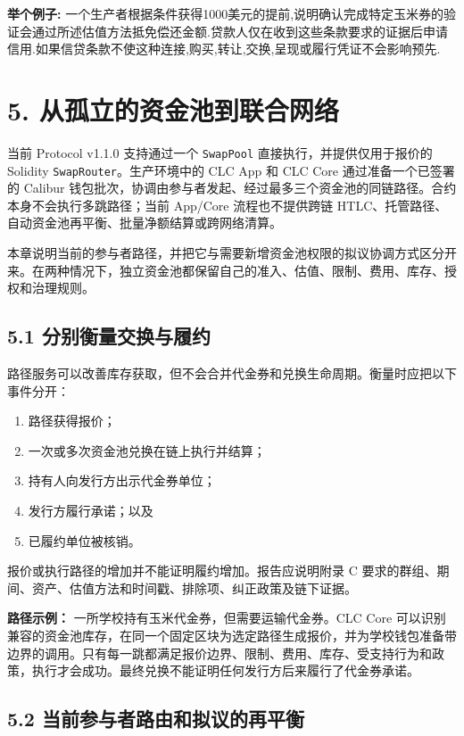 \documentclass[11pt]{article}
\begin{document}
\textbf{举个例子:} 一个生产者根据条件获得1000美元的提前,说明确认完成特定玉米券的验证会通过所述估值方法抵免偿还金额.贷款人仅在收到这些条款要求的证据后申请信用.如果信贷条款不使这种连接,购买,转让,交换,呈现或履行凭证不会影响预先.


\section*{5. 从孤立的资金池到联合网络}

当前 Protocol v1.1.0 支持通过一个 \texttt{SwapPool} 直接执行，并提供仅用于报价的 Solidity \texttt{SwapRouter}。生产环境中的 CLC App 和 CLC Core 通过准备一个已签署的 Calibur 钱包批次，协调由参与者发起、经过最多三个资金池的同链路径。合约本身不会执行多跳路径；当前 App/Core 流程也不提供跨链 HTLC、托管路径、自动资金池再平衡、批量净额结算或跨网络清算。

本章说明当前的参与者路径，并把它与需要新增资金池权限的拟议协调方式区分开来。在两种情况下，独立资金池都保留自己的准入、估值、限制、费用、库存、授权和治理规则。

\subsection*{5.1 分别衡量交换与履约}

路径服务可以改善库存获取，但不会合并代金券和兑换生命周期。衡量时应把以下事件分开：

\begin{enumerate}[leftmargin=*]
\item 路径获得报价；
\item 一次或多次资金池兑换在链上执行并结算；
\item 持有人向发行方出示代金券单位；
\item 发行方履行承诺；以及
\item 已履约单位被核销。
\end{enumerate}
报价或执行路径的增加并不能证明履约增加。报告应说明附录 C 要求的群组、期间、资产、估值方法和时间戳、排除项、纠正政策及链下证据。

\textbf{路径示例：} 一所学校持有玉米代金券，但需要运输代金券。CLC Core 可以识别兼容的资金池库存，在同一个固定区块为选定路径生成报价，并为学校钱包准备带边界的调用。只有每一跳都满足报价边界、限制、费用、库存、受支持行为和政策，执行才会成功。最终兑换不能证明任何发行方后来履行了代金券承诺。

\subsection*{5.2 当前参与者路由和拟议的再平衡}
\end{document}
